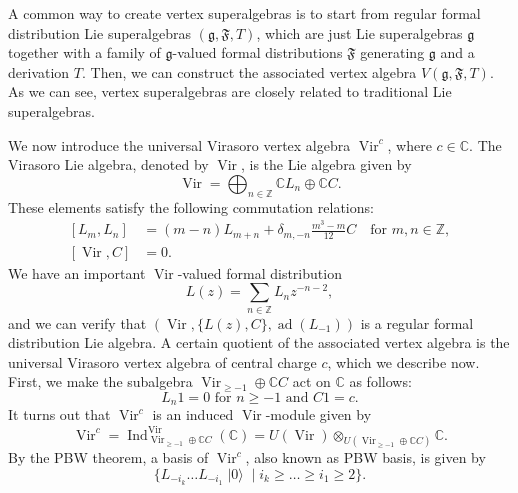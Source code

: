 \documentclass[a4paper, 12pt, reqno]{amsart}
\theoremstyle{remark}
\DeclareMathOperator{\Vir}{Vir}
\DeclareMathOperator{\Ind}{Ind}
\DeclareMathOperator{\vac}{|0\rangle}
\DeclareMathOperator{\ad}{ad}
\begin{document}
A common way to create vertex superalgebras is to start from regular formal distribution Lie superalgebras $(\mathfrak{g}, \mathfrak{F}, T)$, which are just Lie superalgebras $\mathfrak{g}$ together with a family of $\mathfrak{g}$-valued formal distributions $\mathfrak{F}$ generating $\mathfrak{g}$ and a derivation $T$.
Then, we can construct the associated vertex algebra $V(\mathfrak{g}, \mathfrak{F}, T)$.
As we can see, vertex superalgebras are closely related to traditional Lie superalgebras.

We now introduce the universal Virasoro vertex algebra $\Vir^c$, where $c \in \mathbb{C}$.
The Virasoro Lie algebra, denoted by $\Vir$, is the Lie algebra given by
\begin{equation*}
  \Vir = \bigoplus_{n \in \mathbb{Z}}\mathbb{C}L_n \oplus \mathbb{C}C.
\end{equation*}
These elements satisfy the following commutation relations:
\begin{equation*}
  \begin{split}
    [L_m, L_n] &= (m - n)L_{m + n} + \delta_{m, -n}\frac{m^3 - m}{12}C \quad \text{for $m, n \in \mathbb{Z}$}, \\
    [\Vir, C] &= 0.
  \end{split}
\end{equation*}
We have an important $\Vir$-valued formal distribution
\begin{equation*}
  L(z) = \sum_{n \in \mathbb{Z}}L_nz^{-n - 2},
\end{equation*}
and we can verify that $(\Vir, \{L(z), C\}, \ad(L_{-1}))$ is a regular formal distribution Lie algebra.
A certain quotient of the associated vertex algebra is the universal Virasoro vertex algebra of central charge $c$, which we describe now.
First, we make the subalgebra $\Vir_{\ge -1} \oplus \mathbb{C}C$ act on $\mathbb{C}$ as follows:
\begin{equation*}
  \text{$L_n1 = 0$ for $n \ge -1$ and $C1 = c$}.
\end{equation*}
It turns out that $\Vir^c$ is an induced $\Vir$-module given by
\begin{equation*}
  \Vir^c = \Ind^{\Vir}_{\Vir_{\ge -1} \oplus \mathbb{C}C}(\mathbb{C}) = U(\Vir) \otimes_{U(\Vir_{\ge -1} \oplus \mathbb{C}C)} \mathbb{C}.
\end{equation*}
By the PBW theorem, a basis of $\Vir^c$, also known as PBW basis, is given by
\begin{equation*}
  \{L_{-i_k}\dots L_{-i_1}\vac \mid i_k \ge \dots \ge i_1 \ge 2\}.
\end{equation*}
\end{document}
